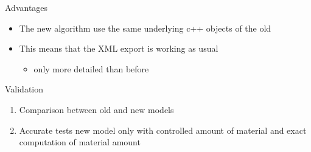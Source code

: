 \documentclass[pdftex, 11pt]{beamer}
\begin{document}
\begin{frame}{Advantages}
  \begin{itemize}
  \item The new algorithm use the \alert{same} underlying c++ objects of the old
  \item This means that the \alert{XML} export is working as usual
    \begin{itemize}
    \item only more \alert{detailed} than before
    \end{itemize}
  \end{itemize}
\end{frame}

\begin{frame}{Validation}
  \begin{enumerate}
  \item \alert{Comparison} between old and new models
  \item Accurate \alert{tests} new model only with controlled amount of material and exact computation of material amount
  \end{enumerate}
\end{frame}
\end{document}
